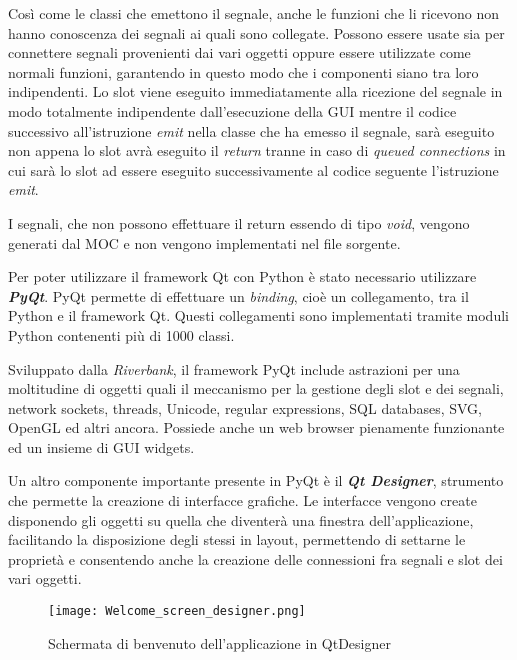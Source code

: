 Così come le classi che emettono il segnale, anche le funzioni che li ricevono non hanno conoscenza dei segnali ai quali sono collegate. Possono essere usate sia per connettere segnali provenienti dai vari oggetti oppure essere utilizzate come normali funzioni, garantendo in questo modo che i componenti siano tra loro indipendenti. Lo slot viene eseguito immediatamente alla ricezione del segnale in modo totalmente indipendente dall'esecuzione della GUI mentre il codice successivo all'istruzione \textit{emit} nella classe che ha emesso il segnale, sarà eseguito non appena lo slot avrà eseguito il \textit{return} tranne in caso di \textit{queued connections} in cui sarà lo slot ad essere eseguito successivamente al codice seguente l'istruzione \textit{emit}.

I segnali, che non possono effettuare il return essendo di tipo \textit{void}, vengono generati dal MOC e non vengono implementati nel file sorgente. 

Per poter utilizzare il framework Qt con Python è stato necessario utilizzare \textbf{\textit{PyQt}}. PyQt permette di effettuare un \textit{binding}, cioè un collegamento, tra il Python e il framework Qt. Questi collegamenti sono implementati tramite moduli Python contenenti più di 1000 classi.

Sviluppato dalla \textit{Riverbank}, il framework PyQt include astrazioni per una moltitudine di oggetti quali il meccanismo per la gestione degli slot e dei segnali, network sockets, threads, Unicode, regular expressions, SQL databases, SVG, OpenGL ed altri ancora. Possiede
anche un web browser pienamente funzionante ed un insieme di GUI widgets.

Un altro componente importante presente in PyQt è il \textbf{\textit{Qt Designer}}, strumento che permette la creazione di interfacce grafiche. 
Le interfacce vengono create disponendo gli oggetti su quella che diventerà una finestra dell'applicazione, facilitando la disposizione degli stessi in layout, permettendo di settarne le proprietà e consentendo anche la creazione delle connessioni fra segnali e slot dei vari oggetti.

\begin{figure}[htpb]
	\begin{center}
		\texttt{[image: Welcome\_screen\_designer.png]}
	\end{center}
	\caption[Schermata di benvenuto dell'applicazione in QtDesigner]{Schermata di benvenuto dell'applicazione in QtDesigner}
\end{figure}

